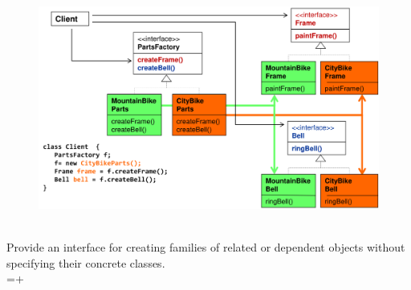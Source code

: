 \begin{figure}[H]
  \centering
  \includegraphics[width=1.0\columnwidth]{figures/abstractFactory.png}
\end{figure}
\begin{intentbox}[Intent]\\
Provide an interface for creating families of related or dependent objects without specifying their concrete classes.\\
  =+\\
\end{intentbox}
